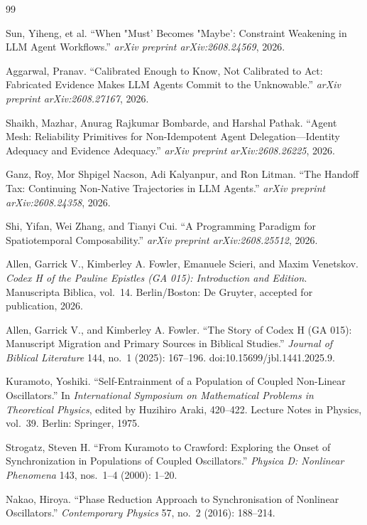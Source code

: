 \documentclass[11pt]{article}
\begin{document}
\begin{thebibliography}{99}

Sun, Yiheng, et al.
\newblock ``When "Must' Becomes "Maybe': Constraint Weakening in LLM Agent Workflows.''
\newblock \emph{arXiv preprint arXiv:2608.24569}, 2026.

Aggarwal, Pranav.
\newblock ``Calibrated Enough to Know, Not Calibrated to Act: Fabricated Evidence Makes LLM Agents Commit to the Unknowable.''
\newblock \emph{arXiv preprint arXiv:2608.27167}, 2026.

Shaikh, Mazhar, Anurag Rajkumar Bombarde, and Harshal Pathak.
\newblock ``Agent Mesh: Reliability Primitives for Non-Idempotent Agent Delegation---Identity Adequacy and Evidence Adequacy.''
\newblock \emph{arXiv preprint arXiv:2608.26225}, 2026.

Ganz, Roy, Mor Shpigel Nacson, Adi Kalyanpur, and Ron Litman.
\newblock ``The Handoff Tax: Continuing Non-Native Trajectories in LLM Agents.''
\newblock \emph{arXiv preprint arXiv:2608.24358}, 2026.

Shi, Yifan, Wei Zhang, and Tianyi Cui.
\newblock ``A Programming Paradigm for Spatiotemporal Composability.''
\newblock \emph{arXiv preprint arXiv:2608.25512}, 2026.

Allen, Garrick V., Kimberley A. Fowler, Emanuele Scieri, and Maxim Venetskov.
\newblock \emph{Codex H of the Pauline Epistles (GA 015): Introduction and Edition}.
\newblock Manuscripta Biblica, vol.~14.
\newblock Berlin/Boston: De Gruyter, accepted for publication, 2026.

Allen, Garrick V., and Kimberley A. Fowler.
\newblock ``The Story of Codex H (GA 015): Manuscript Migration and Primary Sources in Biblical Studies.''
\newblock \emph{Journal of Biblical Literature} 144, no.~1 (2025): 167--196.
\newblock doi:10.15699/jbl.1441.2025.9.

Kuramoto, Yoshiki.
\newblock ``Self-Entrainment of a Population of Coupled Non-Linear Oscillators.''
\newblock In \emph{International Symposium on Mathematical Problems in Theoretical Physics}, edited by Huzihiro Araki, 420--422.
\newblock Lecture Notes in Physics, vol.~39.
\newblock Berlin: Springer, 1975.

Strogatz, Steven H.
\newblock ``From Kuramoto to Crawford: Exploring the Onset of Synchronization in Populations of Coupled Oscillators.''
\newblock \emph{Physica D: Nonlinear Phenomena} 143, nos.~1--4 (2000): 1--20.

Nakao, Hiroya.
\newblock ``Phase Reduction Approach to Synchronisation of Nonlinear Oscillators.''
\newblock \emph{Contemporary Physics} 57, no.~2 (2016): 188--214.

\end{thebibliography}
\end{document}
